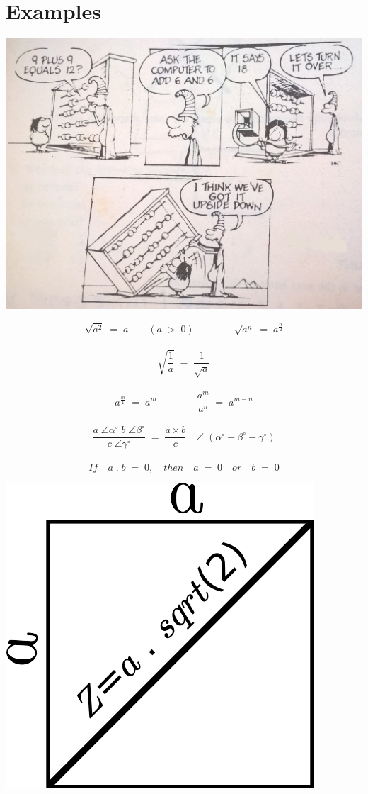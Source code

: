 \section{Examples}
\begin{minipage}{\linewidth}
	\includegraphics[scale=0.2]{./image/upsidedown.jpg}
\end{minipage}
\minipagespace{.2cm}
\[\sqrt{a^2} \; = \; a \qquad (a \; > \; 0) \qquad \qquad \sqrt{a^n} \; = \; a^{\frac{n}{2}}\] \\
\[\sqrt{\frac{1}{a}} \; = \; \frac{1}{\sqrt{a}}\] \\
\[a^{\frac{m}{1}} \; = \; a^m \qquad \qquad \frac{a^m}{a^n} \; = \; a^{m-n}\] \\
\[\frac{a \; \angle \alpha^\circ \; b \; \angle \beta^\circ}{c \; \angle \gamma^\circ} \; = \; \frac{a \times b}{c} \quad \angle \; (\alpha^\circ + \beta^\circ - \gamma^\circ)\] \cite{book-12}
\\
\[If \quad a \; . \; b \; = \; 0, \quad then \quad a \; = \; 0 \quad or \quad b \; = \; 0\]
\emptyline
\begin{minipage}{0.60\linewidth}
	\includegraphics[scale=0.5]{./image/squareproperty.png}
\end{minipage}
